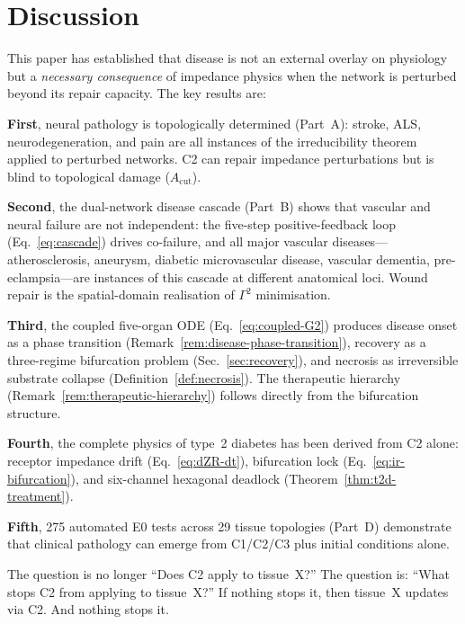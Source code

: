 \documentclass[aps,pre,twocolumn,superscriptaddress,floatfix]{revtex4-2}
\begin{document}
\section{Discussion}
\label{sec:discussion}

This paper has established that disease is not an
external overlay on physiology but a \emph{necessary
consequence} of impedance physics when the network
is perturbed beyond its repair capacity.
The key results are:

\textbf{First}, neural pathology is topologically
determined (Part~A): stroke, ALS, neurodegeneration,
and pain are all instances of the irreducibility
theorem applied to perturbed networks.
C2 can repair impedance perturbations but is blind
to topological damage ($A_{\text{cut}}$).

\textbf{Second}, the dual-network disease cascade
(Part~B) shows that vascular and neural failure are
not independent: the five-step positive-feedback
loop (Eq.~\ref{eq:cascade}) drives co-failure, and
all major vascular diseases---atherosclerosis,
aneurysm, diabetic microvascular disease, vascular
dementia, pre-eclampsia---are instances of this
cascade at different anatomical loci.
Wound repair is the spatial-domain realisation of
$\Gamma^2$ minimisation.

\textbf{Third}, the coupled five-organ ODE
(Eq.~\ref{eq:coupled-G2}) produces disease onset as
a phase transition (Remark~\ref{rem:disease-phase-transition}),
recovery as a three-regime bifurcation problem
(Sec.~\ref{sec:recovery}), and necrosis as
irreversible substrate collapse
(Definition~\ref{def:necrosis}).
The therapeutic hierarchy
(Remark~\ref{rem:therapeutic-hierarchy})
follows directly from the bifurcation structure.

\textbf{Fourth}, the complete physics of type~2
diabetes has been derived from C2 alone:
receptor impedance drift
(Eq.~\ref{eq:dZR-dt}), bifurcation lock
(Eq.~\ref{eq:ir-bifurcation}), and
six-channel hexagonal deadlock
(Theorem~\ref{thm:t2d-treatment}).

\textbf{Fifth}, 275 automated E0 tests across 29
tissue topologies (Part~D) demonstrate that clinical
pathology can emerge from C1/C2/C3 plus initial
conditions alone.

The question is no longer ``Does C2 apply to
tissue~X?''
The question is: ``What stops C2 from applying to
tissue~X?''
If nothing stops it, then tissue~X updates via C2.
And nothing stops it.
\end{document}
